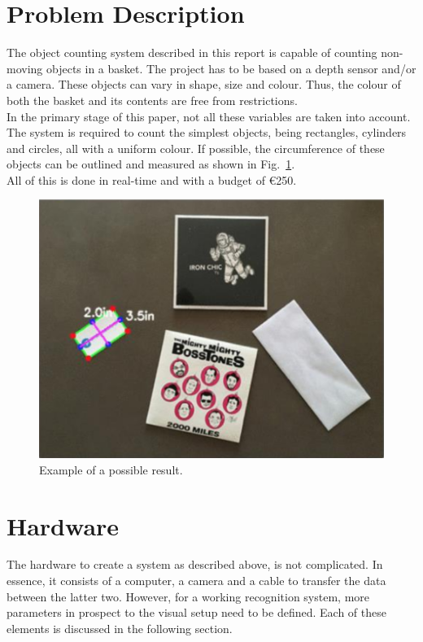 \documentclass{article}
\begin{document}
\section{Problem Description}
The object counting system described in this report is capable of counting non-moving objects in a basket. The project has to be based on a depth sensor and/or a camera. These objects can vary in shape, size and colour. Thus, the colour of both the basket and its contents are free from restrictions.\\
In the primary stage of this paper, not all these variables are taken into account. The system is required to count the simplest objects, being rectangles, cylinders and circles, all with a uniform colour. If possible, the circumference of these objects can be outlined and measured as shown in Fig.~\ref{fig:example}.\\ All of this is done in real-time and with a budget of \euro 250.
\begin{figure}[h]
\centering
\includegraphics[width=0.7\linewidth]{opdracht.png}
\caption{Example of a possible result.}
\label{fig:example}
\end{figure}

\section{Hardware}

\noindent The hardware to create a system as described above, is not complicated. In essence, it consists of a computer, a camera and a cable to transfer the data between the latter two. However, for a working recognition system, more parameters in prospect to the visual setup need to be defined. Each of these elements is discussed in the following section.\\
\end{document}
